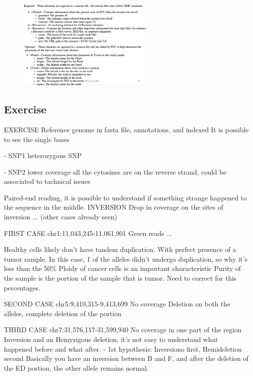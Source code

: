 \begin{figure}
    \caption{}
    \centering
    \includegraphics[width=0.6\textwidth]{structureXMLfile.PNG}
    \label{XMLfile}
\end{figure} 

\subsection*{Exercise}


EXERCISE
Reference genome in fasta file, annotations, and indexed
It is possible to see the single bases

- SNP1
heterozygous SNP

- SNP2
lower coverage
all the cytosines are on the reverse strand, could be associated to tachnical issues


Paired-end reading, it is possible to understand if something strange happened to the sequence in the middle.
INVERSION
Drop in coverage on the sites of inversion
... (other cases already seen)

FIRST CASE chr1:11,043,245-11,061,901
Green reads
...

Healthy cells likely don't have tandem duplication. With perfect presence of a tumor sample. In this case, 1 of the alleles didn't undergo duplication, so why it's less than the 50\% 
Ploidy of cancer cells is an important characteristic
Purity of the sample is the portion of the sample that is tumor. Need to correct for this percentages.

SECOND CASE chr5:9,410,315-9,413,699
No coverage
Deletion on both the alleles, complete deletion of the portion

THIRD CASE chr7:31,576,117-31,599,940
No coverage in one part of the region
Inversion and an Hemyzigous deletion, it's not easy to understand what happened before and what after.
- 1st hypothesis: Inversiono first, Hemideletion second
Basically you have an inversion between B and F, and after the deletion of the ED portion, the other allele remains normal.

